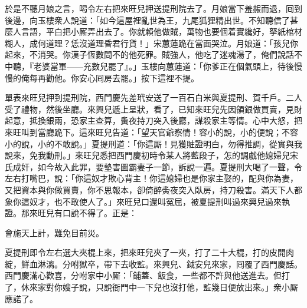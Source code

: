 {}於是不聽月娘之言，喝令左右把來旺兒押送提刑院去了。月娘當下羞赧而退，囘到後邊，向玉樓衆人說道：「如今這屋裡亂世為王，九尾狐狸精出世。不知聽信了甚麼人言語，平白把小厮弄出去了。你就賴他做賊，萬物也要個着實纔好，拏紙棺材糊人，成何道理？恁沒道理昏君行貨！」宋蕙蓮跪在當面哭泣。月娘道：「孩兒你起來，不消哭。你漢子恆數問不的他死罪。賊強人，他吃了迷魂湯了，俺們說話不中聽，『老婆當軍——充數兒罷了』。」玉樓向蕙蓮道：「你爹正在個氣頭上，待後慢慢的俺每再勸他。你安心囘房去罷。」按下這裡不提。

單表來旺兒押到提刑院，西門慶先差玳安送了一百石白米與夏提刑、賀千戶。二人受了禮物，然後坐廳。來興兒遞上呈狀，看了，已知來旺兒先因領銀做買賣，見財起意，抵換銀兩，恐家主查算，夤夜持刀突入後廳，謀殺家主等情。心中大怒，把來旺叫到當廳跪下。這來旺兒告道：「望天官爺察情！容小的說，小的便說；不容小的說，小的不敢說。」夏提刑道：「你這厮！見獲賍證明白，勿得推調，從實與我說來，免我動刑。」來旺兒悉把西門慶初時令某人將藍段子，怎的調戲他媳婦兒宋氏成奸，如今故入此罪，要墊害圖霸妻子一節，訴說一遍。夏提刑大喝了一聲，令左右打嘴巴，說：「你這奴才欺心背主！你這媳婦也是你家主娶的，{}配與你為妻，又把資本與你做買賣，你不思報本，卻倚醉夤夜突入臥房，持刀殺害。滿天下人都象你這奴才，也不敢使人了。」來旺兒口還叫冤屈，被夏提刑叫過來興兒過來執證。那來旺兒有口說不得了。正是：

會施天上計，難免目前災。

夏提刑即令左右選大夾棍上來，把來旺兒夾了一夾，打了二十大棍，打的皮開肉綻，鮮血淋漓。分咐獄卒，帶下去收監。來興兒、鉞安兒來家，囘覆了西門慶話。西門慶滿心歡喜，分咐家中小厮：「鋪蓋、飯食，一些都不許與他送進去。但打了，休來家對你嫂子說，只說衙門中一下兒也沒打他，監幾日便放出來。」衆小厮應諾了。

